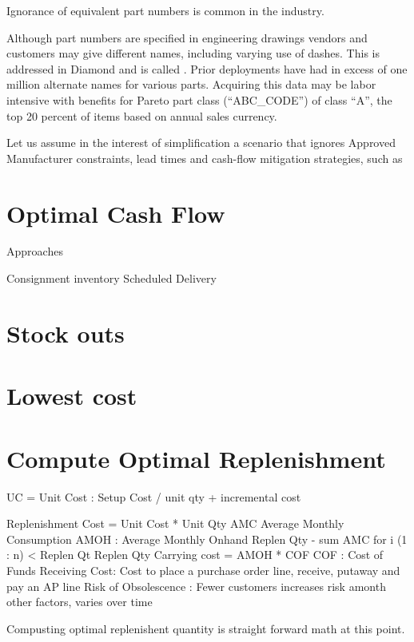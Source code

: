 \documentclass[letterpaper,10pt,english]{sphinxmanual}
\begin{document}
Ignorance of equivalent part numbers is common in the industry.

Although part numbers are specified in engineering drawings vendors and customers may
give different names, including varying use of dashes.  This is addressed in Diamond and
is called .  Prior deployments have had in excess of one million alternate
names for various parts.  Acquiring this data may be labor intensive with benefits for
Pareto part class (“ABC\_CODE”) of class “A”, the top 20 percent of items based on annual
sales currency.

Let us assume in the interest of simplification a scenario that ignores Approved Manufacturer
constraints, lead times and cash-flow mitigation strategies, such as


\section{Optimal Cash Flow}
\label{\detokenize{OptimalReplenishmentQty:optimal-cash-flow}}
Approaches

Consignment inventory
Scheduled Delivery


\section{Stock outs}
\label{\detokenize{OptimalReplenishmentQty:stock-outs}}

\section{Lowest cost}
\label{\detokenize{OptimalReplenishmentQty:lowest-cost}}

\section{Compute Optimal Replenishment}
\label{\detokenize{OptimalReplenishmentQty:compute-optimal-replenishment}}
UC = Unit Cost  : Setup Cost / unit qty + incremental cost

Replenishment Cost = Unit Cost * Unit Qty
AMC Average Monthly Consumption
AMOH : Average Monthly Onhand  Replen Qty - sum AMC for i (1 : n) \textless{} Replen Qt
Replen Qty
Carrying cost = AMOH * COF
COF : Cost of Funds
Receiving Cost:  Cost to place a purchase order line, receive, putaway and pay an AP line
Risk of Obsolescence :  Fewer customers increases risk amonth other factors, varies over time

Compusting optimal replenishent quantity is straight forward math at this point.
\end{document}
